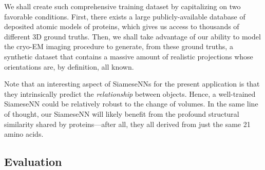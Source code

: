 We shall create such comprehensive training dataset by capitalizing on two favorable conditions. First, there exists a large publicly-available database of deposited atomic models of proteins, which gives us access to thousands of different 3D ground truths. Then, we shall take advantage of our ability to model the cryo-EM imaging procedure to generate, from these ground truths, a synthetic dataset that contains a massive amount of realistic projections whose orientations are, by definition, all known.

Note that an interesting aspect of SiameseNNs for the present application is that they intrinsically predict the \textit{relationship} between objects. Hence, a well-trained SiameseNN could be relatively robust to the change of volumes. In the same line of thought, our SiameseNN will likely benefit from the profound structural similarity shared by proteins---after all, they all derived from just the same 21 amino acids.

\subsection{Evaluation}\label{sec:results:evaluation}




